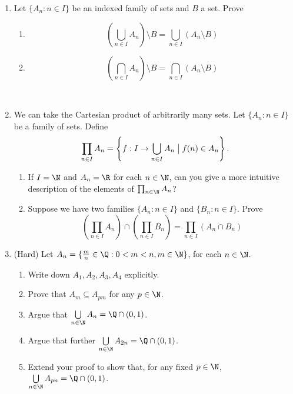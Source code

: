 \begin{enumerate}
\item Let $\{A_n : n \in I\}$ be an indexed family of sets and $B$ a set. Prove
\begin{enumerate}
    \item \[\left(\bigcup_{n \in I} A_n \right) \setminus B = \bigcup_{n \in I} (A_n \setminus B)\]
    \item \[\left(\bigcap_{n \in I} A_n \right) \setminus B = \bigcap_{n \in I} (A_n \setminus B)\]
\end{enumerate}\

\item We can take the Cartesian product of arbitrarily many sets. Let $\{A_n : n \in I\}$ be a family of sets. Define
\[
\prod_{n \in I} A_n = \left\{f : I \to \bigcup_{n \in I} A_n \bigm| f(n) \in A_n\right\}.
\]
\begin{enumerate}
    \item If $I = \N$ and $A_n = \R$ for each $n \in \N$, can you give a more intuitive description of the elements of $\prod_{n \in \N} A_n$?
    \item Suppose we have two families $\{A_n : n \in I\}$ and $\{B_n : n \in I\}$. Prove
    \[
        \left(\prod_{n \in I} A_n \right) \cap \left(\prod_{n \in I} B_n \right) = \prod_{n \in I} (A_n \cap B_n)
    \]
\end{enumerate}

	\item (Hard) Let $A_n=\{\frac mn\in\Q:0<m<n, m\in \N\}$, for each $n\in\N$.
	\begin{enumerate}
		\item Write down $A_1,A_2,A_3,A_4$ explicitly.
		\item Prove that $A_m\subseteq A_{pm}$ for any $p\in\N$.
		\item Argue that $\bigcup\limits_{n\in\N}A_n=\Q\cap (0,1)$.
		\item Argue that further $\bigcup\limits_{n\in\N}A_{2n}=\Q\cap (0,1)$.
		\item Extend your proof to show that, for any fixed $p\in\N$, $\bigcup\limits_{n\in\N}A_{pn}=\Q\cap (0,1)$.
	\end{enumerate}
	

\end{enumerate}
